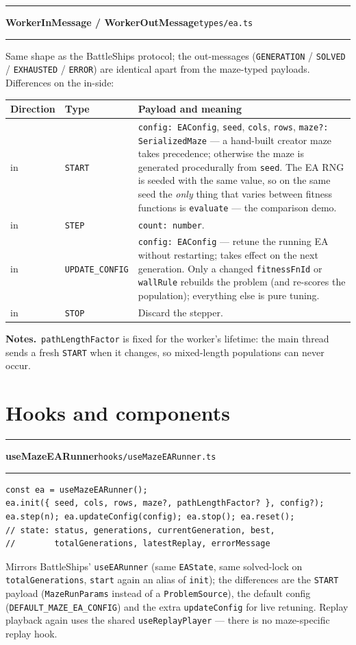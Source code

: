 \documentclass[11pt,a4paper]{report}
\newcommand{\srcfile}[1]{\texttt{\small #1}}   %
\newcommand{\ts}[1]{\texttt{#1}}               %
\newenvironment{apientry}[2]{%
  \par\medskip\noindent
  \begin{minipage}{\textwidth}
  \hrule\vspace{0.6ex}
  {\large\ttfamily\bfseries #1}\hfill{\footnotesize\srcfile{#2}}
  \vspace{0.4ex}\hrule\medskip
}{%
  \end{minipage}\par\medskip
}
\newcommand{\apifield}[1]{\par\smallskip\noindent\textbf{#1.}\ }
\begin{document}
\begin{apientry}{WorkerInMessage / WorkerOutMessage}{types/ea.ts}
Same shape as the BattleShips protocol; the out-messages
(\ts{GENERATION} / \ts{SOLVED} / \ts{EXHAUSTED} / \ts{ERROR}) are
identical apart from the maze-typed payloads. Differences on the in-side:

\begin{center}
\begin{tabularx}{\textwidth}{l l X}
  \toprule
  \textbf{Direction} & \textbf{Type} & \textbf{Payload and meaning} \\
  \midrule
  in & \ts{START} & \ts{config: EAConfig}, \ts{seed}, \ts{cols},
       \ts{rows}, \ts{maze?: SerializedMaze} --- a hand-built creator
       maze takes precedence; otherwise the maze is generated procedurally
       from \ts{seed}. The EA RNG is seeded with the same value, so on the
       same seed the \emph{only} thing that varies between fitness
       functions is \ts{evaluate} --- the comparison demo. \\
  in & \ts{STEP} & \ts{count: number}. \\
  in & \ts{UPDATE\_CONFIG} & \ts{config: EAConfig} --- retune the running
       EA without restarting; takes effect on the next generation. Only a
       changed \ts{fitnessFnId} or \ts{wallRule} rebuilds the problem
       (and re-scores the population); everything else is pure tuning. \\
  in & \ts{STOP} & Discard the stepper. \\
  \bottomrule
\end{tabularx}
\end{center}
\apifield{Notes}\ts{pathLengthFactor} is fixed for the worker's lifetime:
the main thread sends a fresh \ts{START} when it changes, so mixed-length
populations can never occur.
\end{apientry}

\section{Hooks and components}

\begin{apientry}{useMazeEARunner}{hooks/useMazeEARunner.ts}
\begin{lstlisting}
const ea = useMazeEARunner();
ea.init({ seed, cols, rows, maze?, pathLengthFactor? }, config?);
ea.step(n); ea.updateConfig(config); ea.stop(); ea.reset();
// state: status, generations, currentGeneration, best,
//        totalGenerations, latestReplay, errorMessage
\end{lstlisting}
Mirrors BattleShips' \ts{useEARunner} (same \ts{EAState}, same
solved-lock on \ts{totalGenerations}, \ts{start} again an alias of
\ts{init}); the differences are the \ts{START} payload
(\ts{MazeRunParams} instead of a \ts{ProblemSource}), the default config
(\ts{DEFAULT\_MAZE\_EA\_CONFIG}) and the extra \ts{updateConfig} for
live retuning. Replay playback again uses the shared
\ts{useReplayPlayer} --- there is no maze-specific replay hook.
\end{apientry}
\end{document}
